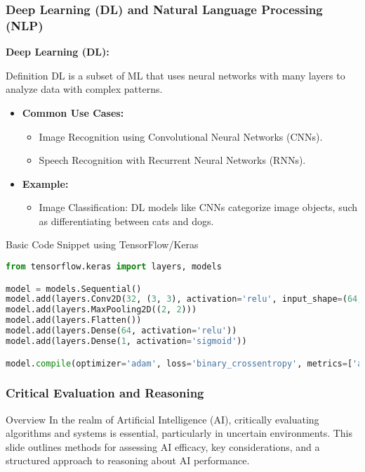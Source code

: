 \documentclass[aspectratio=169]{beamer}
\begin{document}
\begin{frame}[fragile]
    \frametitle{Deep Learning (DL) and Natural Language Processing (NLP)}
    
    \textbf{Deep Learning (DL):} 
    \begin{block}{Definition}
        DL is a subset of ML that uses neural networks with many layers to analyze data with complex patterns.
    \end{block}
    
    \begin{itemize}
        \item \textbf{Common Use Cases:}
        \begin{itemize}
            \item Image Recognition using Convolutional Neural Networks (CNNs).
            \item Speech Recognition with Recurrent Neural Networks (RNNs).
        \end{itemize}
        \item \textbf{Example:} 
            \begin{itemize}
                \item Image Classification: DL models like CNNs categorize image objects, such as differentiating between cats and dogs.
            \end{itemize}
    \end{itemize}
    
    \begin{block}{Basic Code Snippet using TensorFlow/Keras}
        \begin{lstlisting}[language=Python]
from tensorflow.keras import layers, models

model = models.Sequential()
model.add(layers.Conv2D(32, (3, 3), activation='relu', input_shape=(64, 64, 3)))
model.add(layers.MaxPooling2D((2, 2)))
model.add(layers.Flatten())
model.add(layers.Dense(64, activation='relu'))
model.add(layers.Dense(1, activation='sigmoid'))

model.compile(optimizer='adam', loss='binary_crossentropy', metrics=['accuracy'])
        \end{lstlisting}
    \end{block}
\end{frame}

\begin{frame}[fragile]
    \frametitle{Critical Evaluation and Reasoning}
    \begin{block}{Overview}
        In the realm of Artificial Intelligence (AI), critically evaluating algorithms and systems is essential, particularly in uncertain environments. This slide outlines methods for assessing AI efficacy, key considerations, and a structured approach to reasoning about AI performance.
    \end{block}
\end{frame}
\end{document}
